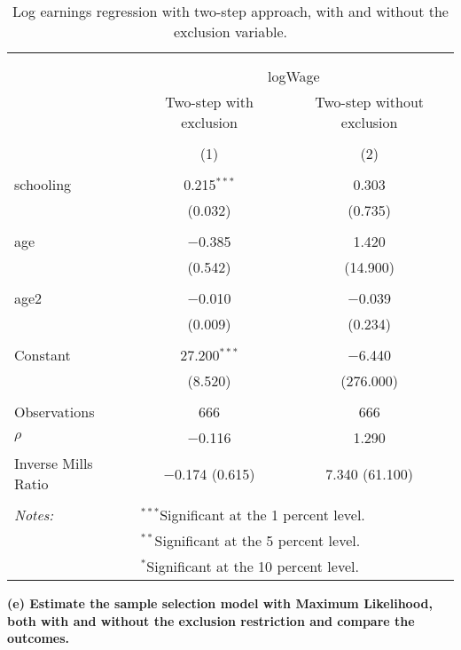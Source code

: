 \documentclass[
]{article}
\begin{document}
\begin{table}[!htbp] \centering 
  \caption{Log earnings regression with two-step approach, 
          with and without the exclusion variable.} 
  \label{tab:q1_d} 
\small 
\begin{tabular}{@{\extracolsep{5pt}}lcc} 
\\[-1.8ex]\hline 
\hline \\[-1.8ex] 
\\[-1.8ex] & \multicolumn{2}{c}{logWage} \\ 
 & Two-step with exclusion & Two-step without exclusion \\ 
\\[-1.8ex] & (1) & (2)\\ 
\hline \\[-1.8ex] 
 schooling & 0.215$^{***}$ & 0.303 \\ 
  & (0.032) & (0.735) \\ 
  & & \\ 
 age & $-$0.385 & 1.420 \\ 
  & (0.542) & (14.900) \\ 
  & & \\ 
 age2 & $-$0.010 & $-$0.039 \\ 
  & (0.009) & (0.234) \\ 
  & & \\ 
 Constant & 27.200$^{***}$ & $-$6.440 \\ 
  & (8.520) & (276.000) \\ 
  & & \\ 
Observations & 666 & 666 \\ 
$\rho$ & $-$0.116 & 1.290 \\ 
Inverse Mills Ratio & $-$0.174  (0.615) & 7.340  (61.100) \\ 
\hline \\[-1.8ex] 
\textit{Notes:} & \multicolumn{2}{l}{$^{***}$Significant at the 1 percent level.} \\ 
 & \multicolumn{2}{l}{$^{**}$Significant at the 5 percent level.} \\ 
 & \multicolumn{2}{l}{$^{*}$Significant at the 10 percent level.} \\ 
\end{tabular} 
\end{table}

\textbf{(e) Estimate the sample selection model with Maximum Likelihood,
both with and without the exclusion restriction and compare the
outcomes.}
\end{document}
